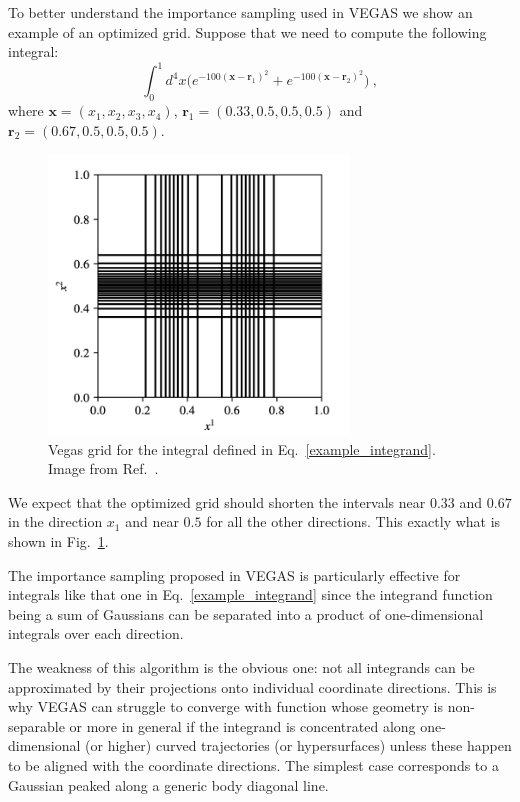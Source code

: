 \documentclass[../main/main.tex]{subfiles}
\begin{document}
To better understand the importance sampling used in VEGAS we show an example of an optimized grid.
Suppose that we need to compute the following integral:
\begin{equation}
	\label{example_integrand}
	\int_0^1 d^4 x \big(e^{-100(\textbf{x}- \textbf{r}_1)^2} + e^{-100(\textbf{x}- \textbf{r}_2)^2} \big) \ ,
\end{equation}
where $\textbf{x} = (x_1, x_2, x_3, x_4)$, $\textbf{r}_1 = (0.33, 0.5, 0.5, 0.5)$ and $\textbf{r}_2 = (0.67, 0.5, 0.5, 0.5)$.
\begin{figure}
	\centering
	\includegraphics[width=8cm]{../images/vegas_grid.png}
	\caption{Vegas grid for the integral defined in Eq.~\ref{example_integrand}. Image from Ref.~\cite{Lepage:2020tgj}.}
	\label{vegas_grid}
\end{figure}
We expect that the optimized grid should shorten the intervals near $0.33$ and $0.67$ in the direction $x_1$ and near $0.5$ for all the 
other directions. This exactly what is shown in Fig.~\ref{vegas_grid}.

The importance sampling proposed in VEGAS is particularly effective for integrals like that one in Eq.~\ref{example_integrand} since the integrand function being a sum of Gaussians can be separated into a product of one-dimensional integrals over each direction.

The weakness of this algorithm is the obvious one: not all integrands can be approximated by their projections onto individual coordinate
directions. This is why VEGAS can struggle to converge with function whose geometry is non-separable or more in general if the integrand
is concentrated along one-dimensional (or higher) curved trajectories (or hypersurfaces) unless these happen to be aligned with the coordinate directions. The simplest case corresponds to a Gaussian peaked along a generic body diagonal line.
\end{document}
